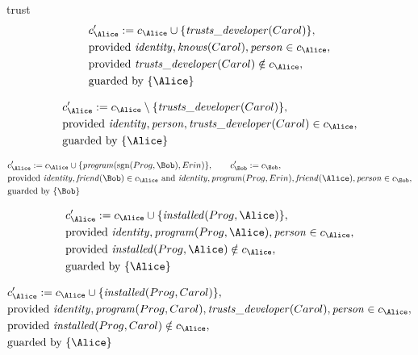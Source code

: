 trust
\fi
\begin{align*}
&
c'_
{
\Alice
}
 := 
c_
{
\Alice
}
 \cup 
\{
\mathit{\detokenize{
trusts_developer
}}
(
Carol
)
\}
,\\
&
\text{provided } 
\mathit{\detokenize{
identity
}}
,
\mathit{\detokenize{
knows
}}
(
Carol
)
,
\mathit{\detokenize{
person
}}
 \in c_
{
\Alice
}
,\\
&
\text{provided } 
\mathit{\detokenize{
trusts_developer
}}
(
Carol
)
 \notin c_
{
\Alice
}
,\\
&
\text{guarded by } \{
\Alice
\}
\end{align*}

\begin{align*}
&
c'_
{
\Alice
}
 := 
c_
{
\Alice
}
 \setminus 
\{
\mathit{\detokenize{
trusts_developer
}}
(
Carol
)
\}
,\\
&
\text{provided } 
\mathit{\detokenize{
identity
}}
,
\mathit{\detokenize{
person
}}
,
\mathit{\detokenize{
trusts_developer
}}
(
Carol
)
 \in c_
{
\Alice
}
,\\
&
\text{guarded by } \{
\Alice
\}
\end{align*}

\begin{align*}
&
c'_
{
\Alice
}
 := 
c_
{
\Alice
}
 \cup 
\{
\mathit{\detokenize{
program
}}
(
\mathrm{sgn}(
Prog
,
\Bob
)
,
Erin
)
\}
, \qquad 
c'_
{
\Bob
}
 := 
c_
{
\Bob
}
,\\
&
\text{provided } 
\mathit{\detokenize{
identity
}}
,
\mathit{\detokenize{
friend
}}
(
\Bob
)
 \in c_
{
\Alice
}
 \text{ and } 
\mathit{\detokenize{
identity
}}
,
\mathit{\detokenize{
program
}}
(
Prog
,
Erin
)
,
\mathit{\detokenize{
friend
}}
(
\Alice
)
,
\mathit{\detokenize{
person
}}
 \in c_
{
\Bob
}
,\\
&
\text{guarded by } \{
\Bob
\}
\end{align*}

\begin{align*}
&
c'_
{
\Alice
}
 := 
c_
{
\Alice
}
 \cup 
\{
\mathit{\detokenize{
installed
}}
(
Prog
,
\Alice
)
\}
,\\
&
\text{provided } 
\mathit{\detokenize{
identity
}}
,
\mathit{\detokenize{
program
}}
(
Prog
,
\Alice
)
,
\mathit{\detokenize{
person
}}
 \in c_
{
\Alice
}
,\\
&
\text{provided } 
\mathit{\detokenize{
installed
}}
(
Prog
,
\Alice
)
 \notin c_
{
\Alice
}
,\\
&
\text{guarded by } \{
\Alice
\}
\end{align*}

\begin{align*}
&
c'_
{
\Alice
}
 := 
c_
{
\Alice
}
 \cup 
\{
\mathit{\detokenize{
installed
}}
(
Prog
,
Carol
)
\}
,\\
&
\text{provided } 
\mathit{\detokenize{
identity
}}
,
\mathit{\detokenize{
program
}}
(
Prog
,
Carol
)
,
\mathit{\detokenize{
trusts_developer
}}
(
Carol
)
,
\mathit{\detokenize{
person
}}
 \in c_
{
\Alice
}
,\\
&
\text{provided } 
\mathit{\detokenize{
installed
}}
(
Prog
,
Carol
)
 \notin c_
{
\Alice
}
,\\
&
\text{guarded by } \{
\Alice
\}
\end{align*}
